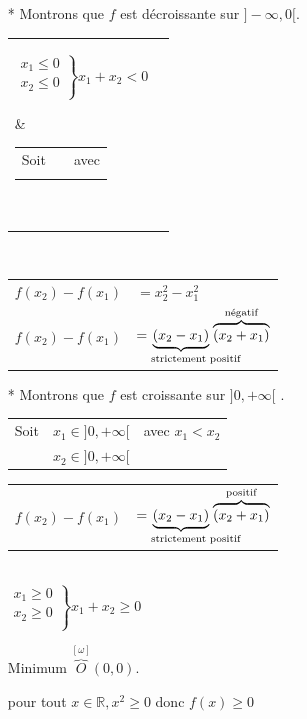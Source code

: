 \begin{itemize}
\item [*] Montrons que $f$ est décroissante sur $] -\infty, 0[ $.\\

\begin{tabular}{ll}
\parbox{3.5cm}{$\left.\begin{array}{c}
                           x_1 \leqslant 0\\
                           x_2 \leqslant 0 \\
                               \end{array} \right\rbrace  x_1 + x_2 < 0 $} 
   &                                
        \begin{tabular}{rl@{$\qquad$}l}
            Soit & $x_1 \in ]-\infty, 0[$ & avec  $x_1 < x_2 $ \\
                 & $x_2 \in  ]-\infty, 0[ $ &  \\
        \end{tabular}\\
\end{tabular}\\        

\begin{tabular}{r@{}l}
$f(x_2) -f(x_1) $ & $=x_{2}^2 -  x_{1}^2$ \\
$f(x_2) -f(x_1) $ 
& $=\underbrace{(x_2 - x_1)}_\text{\makebox[1.5cm][l]{strictement positif}}
    \overbrace{(x_2 + x_1)}^\text{négatif}
  $ \\
\end{tabular} 

\newpage

\item [*] Montrons que $f$ est croissante sur $] 0, +\infty[$ .\\

\begin{tabular}{rl@{$\qquad$}l}
 Soit & $x_1 \in ]0, +\infty[$ & avec  $x_1 < x_2 $ \\
     & $x_2 \in  ]0, +\infty[ $ &  \\
\end{tabular}


\begin{tabular}{r@{}l}
$f(x_2) -f(x_1) $ 
& $=\underbrace{(x_2 - x_1)}_\text{\makebox[1.5cm][l]{strictement positif}}
    \overbrace{(x_2 + x_1)}^\text{positif}
  $ \\
\end{tabular}  \\


$\left.\begin{array}{c}
        x_1 \geqslant 0\\
        x_2 \geqslant 0 \\
\end{array} \right\rbrace  x_1 + x_2 \geqslant 0 $

Minimum $\overbrace{O}^{[\omega]}(0,0)$.

pour tout $x \in \mathbb{R}, x^2 \geqslant 0 $ donc $f(x) \geqslant 0$

\end{itemize}


